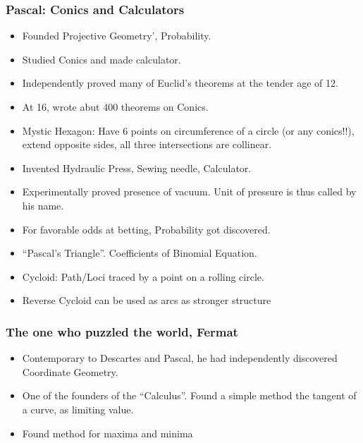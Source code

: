 \begin{frame}[fragile]
\frametitle{Pascal: Conics and Calculators}
\begin{itemize}[label=\textbullet, noitemsep,nolistsep]
\item Founded Projective Geometry', Probability. 
\item Studied Conics and made calculator.
\item Independently proved many of Euclid's theorems at the tender age of 12.
\item At 16, wrote abut 400 theorems on Conics.
\item Mystic Hexagon: Have 6 points on circumference of  a circle (or any conics!!), extend opposite sides, all three intersections are collinear.
\item Invented Hydraulic Press, Sewing needle, Calculator.
\item Experimentally proved presence of vacuum. Unit of pressure is  thus called by his name.
\item For favorable odds at betting, Probability  got discovered.
\item ``Pascal's Triangle''. Coefficients of Binomial Equation.
\item Cycloid: Path/Loci traced by a point on a rolling circle.
\item Reverse Cycloid can be used as arcs as stronger structure
\end{itemize}
\end{frame}

\begin{frame}[fragile]
\frametitle{The one who puzzled the world, Fermat}
\begin{itemize}[label=\textbullet, noitemsep,nolistsep]
\item Contemporary to Descartes and Pascal, he had independently discovered Coordinate Geometry.
\item One of the founders of the ``Calculus''. Found a simple method the tangent of a curve, as limiting value.
\item Found method for maxima and minima 
\end{itemize}
\end{frame}

